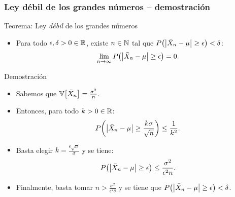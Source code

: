 \documentclass[table]{beamer}
\begin{document}
\begin{frame}
    \frametitle{Ley débil de los grandes números -- demostración}
    \begin{block}{Teorema: Ley \emph{débil} de los grandes números}
        \begin{itemize}
            \item Para todo $\epsilon, \delta > 0 \in \mathbb{R}$, existe $n \in \mathbb{N}$ tal que $\prob{\vparens{\bar{X}_{n} - \mu} \geq \epsilon} < \delta$:
                \begin{equation*}
                    \lim_{n \rightarrow \infty} \prob{\vparens{\bar{X}_{n} - \mu} \geq \epsilon} = 0 .
                \end{equation*}
        \end{itemize}
    \end{block}
    \begin{block}{Demostración}
        \begin{itemize}
            \item Sabemos que $\variance{\bar{X}_{n}} = \frac{\sigma^{2}}{n}$.
            \item Entonces, para todo $k > 0 \in \mathbb{R}$:
                \begin{equation*}
                    \prob{\vparens{\bar{X}_{n} - \mu} \geq \frac{k \sigma}{\sqrt{n}}} \leq \frac{1}{k^{2}} .
                \end{equation*}
            \item Basta elegir $k = \frac{\epsilon \sqrt{n}}{\sigma}$ y se tiene:
                \begin{equation*}
                    \prob{\vparens{\bar{X}_{n} - \mu} \geq \epsilon} \leq \frac{\sigma^{2}}{\epsilon^{2} n} .
                \end{equation*}
            \item Finalmente, basta tomar $n > \frac{\sigma^{2}}{\epsilon^{2} \delta}$ y se tiene que
                 $\prob{\vparens{\bar{X}_{n} - \mu} \geq \epsilon} < \delta$.
        \end{itemize}
    \end{block}
\end{frame}
\end{document}
